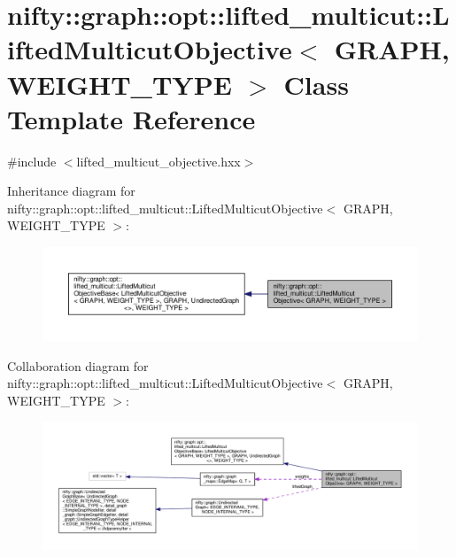 \hypertarget{classnifty_1_1graph_1_1opt_1_1lifted__multicut_1_1LiftedMulticutObjective}{}\section{nifty\+:\+:graph\+:\+:opt\+:\+:lifted\+\_\+multicut\+:\+:Lifted\+Multicut\+Objective$<$ G\+R\+A\+PH, W\+E\+I\+G\+H\+T\+\_\+\+T\+Y\+PE $>$ Class Template Reference}
\label{classnifty_1_1graph_1_1opt_1_1lifted__multicut_1_1LiftedMulticutObjective}


{\ttfamily \#include $<$lifted\+\_\+multicut\+\_\+objective.\+hxx$>$}



Inheritance diagram for nifty\+:\+:graph\+:\+:opt\+:\+:lifted\+\_\+multicut\+:\+:Lifted\+Multicut\+Objective$<$ G\+R\+A\+PH, W\+E\+I\+G\+H\+T\+\_\+\+T\+Y\+PE $>$\+:
\nopagebreak
\begin{figure}[H]
\begin{center}
\leavevmode
\includegraphics[width=350pt]{classnifty_1_1graph_1_1opt_1_1lifted__multicut_1_1LiftedMulticutObjective__inherit__graph}
\end{center}
\end{figure}


Collaboration diagram for nifty\+:\+:graph\+:\+:opt\+:\+:lifted\+\_\+multicut\+:\+:Lifted\+Multicut\+Objective$<$ G\+R\+A\+PH, W\+E\+I\+G\+H\+T\+\_\+\+T\+Y\+PE $>$\+:
\nopagebreak
\begin{figure}[H]
\begin{center}
\leavevmode
\includegraphics[width=350pt]{classnifty_1_1graph_1_1opt_1_1lifted__multicut_1_1LiftedMulticutObjective__coll__graph}
\end{center}
\end{figure}

